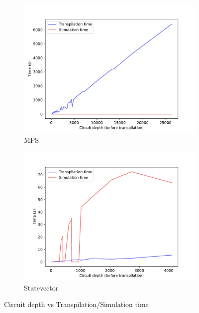\documentclass[11pt]{article}
\theoremstyle{definition}
\theoremstyle{remark}
\begin{document}
\begin{figure}[h!]
  \begin{subfigure}{0.48\textwidth}
    \includegraphics[width=\textwidth]{../results/figures/circuit_depth_v_tran_time_and_sim_time-MPS.pdf}
    \caption{MPS}
  \end{subfigure}
  \begin{subfigure}{0.48\textwidth}
    \includegraphics[width=\textwidth]{../results/figures/circuit_depth_v_tran_time_and_sim_time-statevector_cpu.pdf}
    \caption{Statevector}
  \end{subfigure}
  \caption{Circuit depth vs Transpilation/Simulation time}
  \label{fig:circuit_depth_of_trans_v_sim}
\end{figure}
\end{document}
